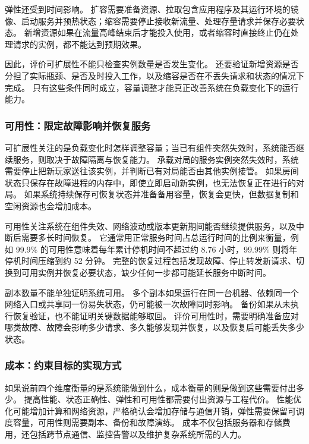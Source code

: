 弹性还受到时间影响。
扩容需要准备资源、拉取包含应用程序及其运行环境的镜像、启动服务并预热状态；缩容需要停止接收新流量、处理存量请求并保存必要状态。
新增资源如果在流量高峰结束后才能投入使用，或者缩容时直接终止仍在处理请求的实例，都不能达到预期效果。

因此，评价可扩展性不能只检查实例数量是否发生变化。
还要验证新增资源是否分担了实际瓶颈、是否及时投入工作，以及缩容是否在不丢失请求和状态的情况下完成。
只有这些条件同时成立，容量调整才能真正改善系统在负载变化下的运行能力。

\subsubsection{可用性：限定故障影响并恢复服务}\label{sec1:availability-goal}

可扩展性关注的是负载变化时怎样调整容量；当已有组件突然失效时，系统能否继续服务，则取决于故障隔离与恢复能力。
承载对局的服务实例突然失效时，系统需要停止把新玩家送往该实例，并判断已有对局能否由其他实例接管。
如果房间状态只保存在故障进程的内存中，即使立即启动新实例，也无法恢复正在进行的对局。
如果系统持续保存可恢复状态并准备备用容量，恢复会更快，但数据复制和空闲资源也会增加成本。

可用性关注系统在组件失效、网络波动或版本更新期间能否继续提供服务，以及中断后需要多长时间恢复。
它通常用正常服务时间占总运行时间的比例来衡量，例如 99.9\% 的可用性意味着每年累计停机时间不超过约 8.76 小时，99.99\% 则将年停机时间压缩到约 52 分钟。
完整的恢复过程包括发现故障、停止转发新请求、切换到可用实例并恢复必要状态，缺少任何一步都可能延长服务中断时间。

副本数量不能单独证明系统可用。
多个副本如果运行在同一台机器、依赖同一个网络入口或共享同一份易失状态，仍可能被一次故障同时影响。
备份如果从未执行恢复验证，也不能证明关键数据能够取回。
评价可用性时，需要明确准备应对哪类故障、故障会影响多少请求、多久能够发现并恢复，以及恢复后可能丢失多少状态。

\subsubsection{成本：约束目标的实现方式}\label{sec1:cost-goal}

如果说前四个维度衡量的是系统能做到什么，成本衡量的则是做到这些需要付出多少。
提高性能、状态正确性、弹性和可用性都需要付出资源与工程代价。
性能优化可能增加计算和网络资源，严格确认会增加存储与通信开销，弹性需要保留可调度容量，可用性则需要副本、备份和故障演练。
成本不仅包括服务器和存储费用，还包括跨节点通信、监控告警以及维护复杂系统所需的人力。

